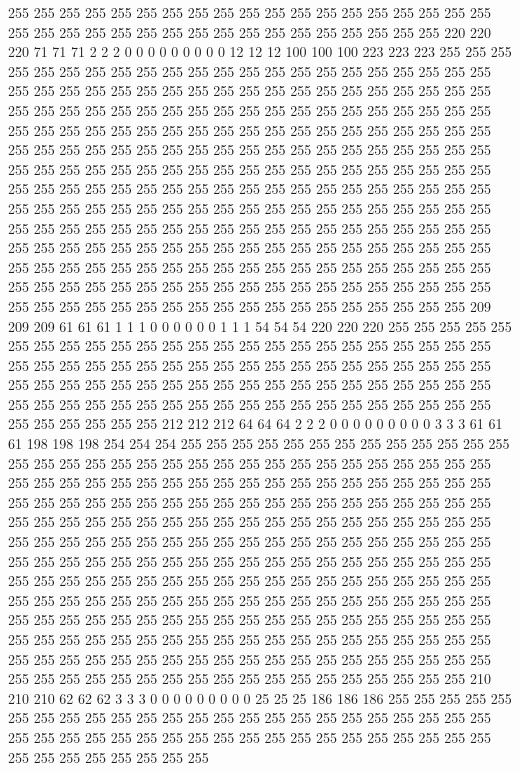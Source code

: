 255 255 255 255 255 255 255 255 255 255 255 255 255 255 255 255 255 255 255 255 255 255 255 255 255 255 255 255 255 255 255 255 255 255 255 255 220 220 220 71 71 71 2 2 2 0 0 0 0 0 0 0 0 0 12 12 12 100 100 100 223 223 223 255 255 255 255 255 255 255 255 255 255 255 255 255 255 255 255 255 255 255 255 255 255 255 255 255 255 255 255 255 255 255 255 255 255 255 255 255 255 255 255 255 255 255 255 255 255 255 255 255 255 255 255 255 255 255 255 255 255 255 255 255 255 255 255 255 
255 255 255 255 255 255 255 255 255 255 255 255 255 255 255 255 255 255 255 255 255 255 255 255 255 255 255 255 255 255 255 255 255 255 255 255 255 255 255 255 255 255 255 255 255 255 255 255 255 255 255 255 255 255 255 255 255 255 255 255 255 255 255 255 255 255 255 255 255 255 255 255 255 255 255 255 255 255 255 255 255 255 255 255 255 255 255 255 255 255 255 255 255 255 255 255 255 255 255 255 255 255 255 255 255 255 255 255 255 255 255 255 255 255 255 255 255 255 255 255 255 255 255 255 255 255 255 255 
255 255 255 255 255 255 255 255 255 255 255 255 255 255 255 255 255 255 255 255 255 255 255 255 255 255 255 255 255 255 255 255 255 255 255 255 255 255 255 255 255 255 255 255 255 255 255 255 255 255 255 255 255 255 255 255 209 209 209 61 61 61 1 1 1 0 0 0 0 0 0 1 1 1 54 54 54 220 220 220 255 255 255 255 255 255 255 255 255 255 255 255 255 255 255 255 255 255 255 255 255 255 255 255 255 255 255 255 255 255 255 255 255 255 255 255 255 255 255 255 255 255 255 255 255 255 255 255 
255 255 255 255 255 255 255 255 255 255 255 255 255 255 255 255 255 255 255 255 255 255 255 255 255 255 255 255 255 255 255 255 255 255 255 255 255 255 255 212 212 212 64 64 64 2 2 2 0 0 0 0 0 0 0 0 0 3 3 3 61 61 61 198 198 198 254 254 254 255 255 255 255 255 255 255 255 255 255 255 255 255 255 255 255 255 255 255 255 255 255 255 255 255 255 255 255 255 255 255 255 255 255 255 255 255 255 255 255 255 255 255 255 255 255 255 255 255 255 255 255 255 255 255 255 255 255 255 
255 255 255 255 255 255 255 255 255 255 255 255 255 255 255 255 255 255 255 255 255 255 255 255 255 255 255 255 255 255 255 255 255 255 255 255 255 255 255 255 255 255 255 255 255 255 255 255 255 255 255 255 255 255 255 255 255 255 255 255 255 255 255 255 255 255 255 255 255 255 255 255 255 255 255 255 255 255 255 255 255 255 255 255 255 255 255 255 255 255 255 255 255 255 255 255 255 255 255 255 255 255 255 255 255 255 255 255 255 255 255 255 255 255 255 255 255 255 255 255 255 255 255 255 255 255 255 255 
255 255 255 255 255 255 255 255 255 255 255 255 255 255 255 255 255 255 255 255 255 255 255 255 255 255 255 255 255 255 255 255 255 255 255 255 255 255 255 255 255 255 255 255 255 255 255 255 255 255 255 255 255 210 210 210 62 62 62 3 3 3 0 0 0 0 0 0 0 0 0 25 25 25 186 186 186 255 255 255 255 255 255 255 255 255 255 255 255 255 255 255 255 255 255 255 255 255 255 255 255 255 255 255 255 255 255 255 255 255 255 255 255 255 255 255 255 255 255 255 255 255 255 255 255 255 255 255 

